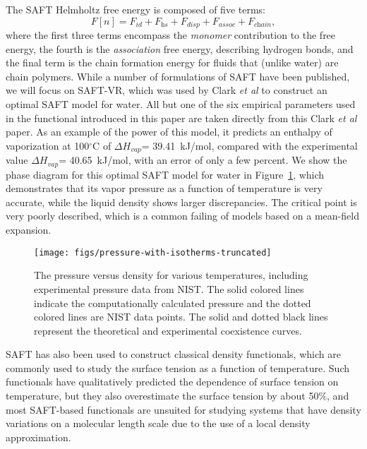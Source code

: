 \documentclass[letterpaper,twocolumn,amsmath,amssymb,prb]{revtex4-1}
\begin{document}
The SAFT Helmholtz free energy is composed of five terms:
\begin{equation} \label{eq:SAFT-free-energy}
  F[n] = F_\textit{id} + F_\textit{hs} + F_\textit{disp} +
  F_\textit{assoc} + F_\textit{chain},
\end{equation}
where the first three terms encompass the \emph{monomer} contribution
to the free energy, the fourth is the \emph{association} free energy,
describing hydrogen bonds, and the final term is the chain formation
energy for fluids that (unlike water) are chain polymers.  While a
number of formulations of SAFT have been published, we will focus on
SAFT-VR\cite{gil-villegas-1997-SAFT-VR}, which was used by Clark
\emph{et al} to construct an optimal SAFT model for
water\cite{clark2006developing}. All but one of the six empirical
parameters used in the functional introduced in this paper are taken
directly from this Clark \emph{et al} paper.  As an example of the
power of this model, it predicts an enthalpy of vaporization at
100$^\circ$C of $\Delta H_{vap}$= 39.41~kJ/mol, compared with the
experimental value $\Delta H_{vap}$= 40.65~kJ/mol\cite{nistwater},
with an error of only a few percent.  We show the phase diagram for
this optimal SAFT model for water in
Figure~\ref{fig:pressure-with-isotherms}, which demonstrates that its
vapor pressure as a function of temperature is very accurate, while
the liquid density shows larger discrepancies.  The critical point is
very poorly described, which is a common failing of models based on a
mean-field expansion.

\begin{figure}
\begin{center}
\texttt{[image: figs/pressure-with-isotherms-truncated]}
\end{center}
\caption{The pressure versus density for various temperatures, including
experimental pressure data from NIST\cite{nistwater}. The solid colored lines
indicate the computationally calculated pressure and the dotted
colored lines are NIST data points. The solid and dotted black lines
represent the theoretical and experimental coexistence curves.}
\label{fig:pressure-with-isotherms}
\end{figure}

SAFT has also been used to construct classical density functionals,
which are commonly used to study the surface tension as a function of
temperature\cite{clark2006developing, gloor2004accurate, kahl2008modified,
  gloor2007prediction, blas2001examination, kiselev2006new,
  gloor2002saft,fu2005vapor-liquid-dft, gross2009density,
  yang1994density}.  Such
functionals have qualitatively predicted the dependence of surface
tension on temperature, but they also overestimate
the surface tension by about 50\%, and most SAFT-based functionals are
unsuited for studying systems that have density variations on a
molecular length scale due to the use of a local density
approximation\cite{gloor2002saft,clark2006developing, gloor2007prediction,
gloor2004accurate, gross2009density, kahl2008modified,
blas2001examination, kiselev2006new}.
\end{document}
